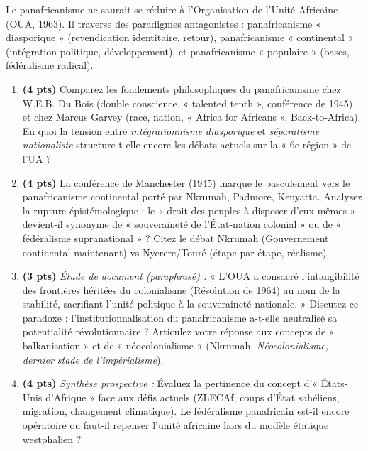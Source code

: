 \documentclass[11pt]{article}
\begin{document}
\begin{exercice}
Le panafricanisme ne saurait se réduire à l'Organisation de l'Unité Africaine (OUA, 1963). Il traverse des paradigmes antagonistes : panafricanisme « diasporique » (revendication identitaire, retour), panafricanisme « continental » (intégration politique, développement), et panafricanisme « populaire » (bases, fédéralisme radical).
\begin{enumerate}
    \item \textbf{(4 pts)} Comparez les fondements philosophiques du panafricanisme chez W.E.B. Du Bois (double conscience, « talented tenth », conférence de 1945) et chez Marcus Garvey (race, nation, « Africa for Africans », Back-to-Africa). En quoi la tension entre \textit{intégrationnisme diasporique} et \textit{séparatisme nationaliste} structure-t-elle encore les débats actuels sur la « 6e région » de l'UA ?
    \item \textbf{(4 pts)} La conférence de Manchester (1945) marque le basculement vers le panafricanisme continental porté par Nkrumah, Padmore, Kenyatta. Analysez la rupture épistémologique : le « droit des peuples à disposer d'eux-mêmes » devient-il synonyme de « souveraineté de l'État-nation colonial » ou de « fédéralisme supranational » ? Citez le débat Nkrumah (Gouvernement continental maintenant) vs Nyerere/Touré (étape par étape, réalisme).
    \item \textbf{(3 pts)} \textit{Étude de document (paraphrasé) :} « L'OUA a consacré l'intangibilité des frontières héritées du colonialisme (Résolution de 1964) au nom de la stabilité, sacrifiant l'unité politique à la souveraineté nationale. » Discutez ce paradoxe : l'institutionnalisation du panafricanisme a-t-elle neutralisé sa potentialité révolutionnaire ? Articulez votre réponse aux concepts de « balkanisation » et de « néocolonialisme » (Nkrumah, \textit{Néocolonialisme, dernier stade de l'impérialisme}).
    \item \textbf{(4 pts)} \textit{Synthèse prospective :} Évaluez la pertinence du concept d'« États-Unis d'Afrique » face aux défis actuels (ZLECAf, coups d'État sahéliens, migration, changement climatique). Le fédéralisme panafricain est-il encore opératoire ou faut-il repenser l'unité africaine hors du modèle étatique westphalien ?
\end{enumerate}
\end{exercice}
\end{document}
